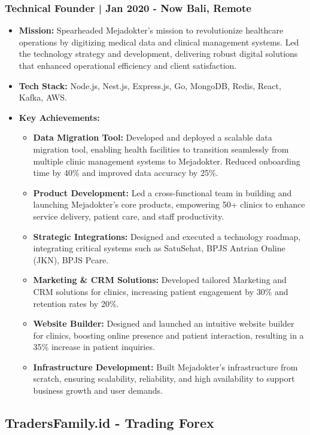 \documentclass[11pt]{article}
\begin{document}
\subsubsection{Technical Founder | Jan 2020 - Now \hfill Bali, Remote}
\begin{itemize}
    \item \textbf{Mission:} Spearheaded Mejadokter's mission to revolutionize healthcare operations by digitizing medical data and clinical management systems. Led the technology strategy and development, delivering robust digital solutions that enhanced operational efficiency and client satisfaction.
    \item \textbf{Tech Stack:} Node.js, Nest.js, Express.js, Go, MongoDB, Redis, React, Kafka, AWS.
    \item \textbf{Key Achievements:}
    \begin{itemize}
        \item \textbf{Data Migration Tool:} Developed and deployed a scalable data migration tool, enabling health facilities to transition seamlessly from multiple clinic management systems to Mejadokter. Reduced onboarding time by 40\% and improved data accuracy by 25\%.
        \item \textbf{Product Development:} Led a cross-functional team in building and launching Mejadokter's core products, empowering 50+ clinics to enhance service delivery, patient care, and staff productivity.
        \item \textbf{Strategic Integrations:} Designed and executed a technology roadmap, integrating critical systems such as SatuSehat, BPJS Antrian Online (JKN), BPJS Pcare.
        \item \textbf{Marketing \& CRM Solutions:} Developed tailored Marketing and CRM solutions for clinics, increasing patient engagement by 30\% and retention rates by 20\%.
        \item \textbf{Website Builder:} Designed and launched an intuitive website builder for clinics, boosting online presence and patient interaction, resulting in a 35\% increase in patient inquiries.
        \item \textbf{Infrastructure Development:} Built Mejadokter's infrastructure from scratch, ensuring scalability, reliability, and high availability to support business growth and user demands.
    \end{itemize}
\end{itemize}

\subsection{TradersFamily.id - Trading Forex}
\end{document}
